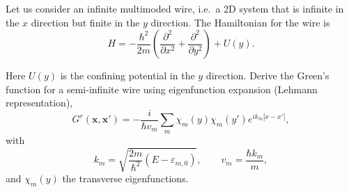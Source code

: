\begin{Problem}
	
	Let us consider an infinite multimoded wire, i.e.\ a 2D system that is infinite
	in the $x$ direction but finite in the $y$ direction. The Hamiltonian for the wire
	is
	\begin{equation}
		H = -\frac{\hbar^2}{2m}\left(\frac{\partial^2}{\partial x^2}
		+ \frac{\partial^2}{\partial y^2}\right) + U(y).
	\end{equation}
	
	Here $U(y)$ is the confining potential in the $y$ direction. Derive the Green's
	function for a semi-infinite wire using eigenfunction expansion (Lehmann
	representation),
	\begin{equation}
		G^r(\mathbf{x},\mathbf{x}')
		= -\frac{i}{\hbar v_m}
		\sum_m \chi_m(y)\chi_m(y') e^{ik_m|x-x'|},
	\end{equation}
	with
	\[
	k_m = \sqrt{\frac{2m}{\hbar^2}(E-\varepsilon_{m,0})},
	\qquad
	v_m = \frac{\hbar k_m}{m},
	\]
	and $\chi_m(y)$ the transverse eigenfunctions.
\end{Problem}
